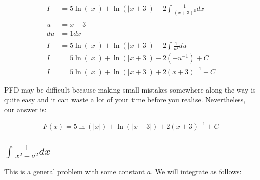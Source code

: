 \documentclass[12pt]{article}
\begin{document}
\begin{align}
    I                            & = 5\ln(|x|) + \ln(|x+3|) - 2\int \frac{1}{(x+3)^2} dx                     \\
    \nonumber                                                                                                \\
    u                            & = x + 3                                                                   \\
    du                           & = 1 dx                                                                    \\
    \nonumber                                                                                                \\
    I                            & = 5\ln(|x|) + \ln(|x+3|) - 2\int \frac{1}{u^2} du                         \\
    I                            & = 5\ln(|x|) + \ln(|x+3|) - 2(-u^{-1}) + C                                 \\
    I                            & = 5\ln(|x|) + \ln(|x+3|) + 2(x+3)^{-1} + C
\end{align}


PFD may be difficult because making small mistakes somewhere along the way is quite easy and it can waste a lot of your time before you realise.
Nevertheless, our answer is:

$$
    F(x) = 5\ln(|x|) + \ln(|x+3|) + 2(x+3)^{-1} + C
$$

\subsection{$\int \frac{1}{x^2-a^2} dx$}

This is a general problem with some constant $a$.
We will integrate as follows:
\end{document}
